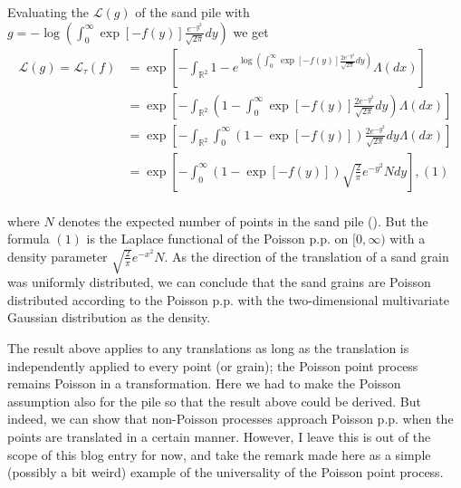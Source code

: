 \documentclass{article}
\begin{document}
  Evaluating the   $\mathcal{L}(g)$ of the sand pile with $ g = - \log \left(   \int_{0}^{\infty}  \exp \left[  -f(y)  \right] \frac{e^{-y^2}}{\sqrt{2 \pi}} dy \right)  $ we get
    \begin{align*}
      \mathcal{L}(g) = \mathcal{L}_{\tau}(f)& = \exp \left[  -\int_{\mathbb{R}^2} 1 -  e^{\log \left(   \int_{0}^{\infty}  \exp \left[  -f(y)   \right] \frac{2e^{-y^2}}{\sqrt{2 \pi}} dy \right) }\Lambda(dx) \right]    \\
      &= \exp \left[-\int_{\mathbb{R}^2} \left(1  -   \int_{0}^{\infty}  \exp [-f(y)] \frac{2e^{-y^2}}{\sqrt{2 \pi}}  dy \right)  \Lambda(dx)  \right] \\
        &= \exp \left[-\int_{\mathbb{R}^2}\int_{0}^{\infty} \left(1  -     \exp [-f(y)]   \right) \frac{2e^{-y^2}}{\sqrt{2 \pi}}dy  \Lambda(dx)  \right] \\ 
        &= \exp \left[-\int_{0}^{\infty} \left(1  -     \exp [-f(y)]   \right)  \sqrt{\frac{2}{\pi}}e^{-y^2} N dy    \right], (1) \\   
    \end{align*}

    where $N$ denotes the expected number of points in the sand pile (). But the formula $(1)$ is the Laplace functional of the Poisson p.p. on $[0, \infty)$ with a density parameter $\sqrt{\frac{2}{\pi}}e^{-x^2} N.$  As the direction of the translation of a sand grain was uniformly distributed, we can conclude that the sand grains are Poisson distributed according to the Poisson p.p. with the two-dimensional multivariate Gaussian distribution as the density.
      
      The result above applies to any translations as long as the translation is independently applied to every point (or grain); the Poisson point process remains Poisson in a transformation. Here we had to make the Poisson assumption also for the pile so that the result above could be derived. But indeed, we can show that non-Poisson processes approach Poisson p.p. when the points are translated in a certain manner. However, I leave this is out of the scope of this blog entry for now, and take the remark made here as a simple (possibly a bit weird) example of the universality of the Poisson point process.
      
\end{document}
